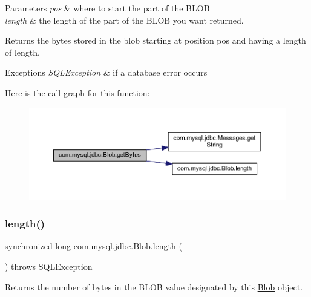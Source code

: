 \begin{DoxyParams}{Parameters}
{\em pos} & where to start the part of the B\+L\+OB \\
\hline
{\em length} & the length of the part of the B\+L\+OB you want returned.\\
\hline
\end{DoxyParams}
\begin{DoxyReturn}{Returns}
the bytes stored in the blob starting at position {\ttfamily pos} and having a length of {\ttfamily length}.
\end{DoxyReturn}

\begin{DoxyExceptions}{Exceptions}
{\em S\+Q\+L\+Exception} & if a database error occurs \\
\hline
\end{DoxyExceptions}
Here is the call graph for this function\+:\nopagebreak
\begin{figure}[H]
\begin{center}
\leavevmode
\includegraphics[width=350pt]{classcom_1_1mysql_1_1jdbc_1_1_blob_a7553db3605516634189d77a9cdfbac60_cgraph}
\end{center}
\end{figure}
\mbox{\label{classcom_1_1mysql_1_1jdbc_1_1_blob_aed91f2ff2c2217b4c52294d356253e63}} 
\subsubsection{\texorpdfstring{length()}{length()}}
{\footnotesize\ttfamily synchronized long com.\+mysql.\+jdbc.\+Blob.\+length (\begin{DoxyParamCaption}{ }\end{DoxyParamCaption}) throws S\+Q\+L\+Exception}

Returns the number of bytes in the B\+L\+OB value designated by this \mbox{\hyperlink{classcom_1_1mysql_1_1jdbc_1_1_blob}{Blob}} object.


